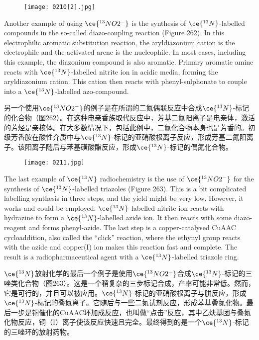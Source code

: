 \documentclass[dvipsnames, svgnames,a4paper,11pt]{article}
\begin{document}
\begin{figure}[h]
	\centering
    \texttt{[image: 0210[2].jpg]} 
     \label{fig261}
\end{figure}

Another example of using \(\ce{^{13}NO2^{-}}\) is the synthesis of \(\ce{^{13}N}\)-labelled compounds in the so-called diazo-coupling reaction (Figure 262). In this electrophilic aromatic substitution reaction, the aryldiazonium cation is the electrophile and the activated arene is the nucleophile. In most cases, including this example, the diazonium compound is also aromatic. Primary aromatic amine reacts with \(\ce{^{13}N}\)-labelled nitrite ion in acidic media, forming the aryldiazonium cation. This cation then reacts with phenyl-sulphonate to couple into a \(\ce{^{13}N}\)-labelled azo-compound.

另一个使用\(\ce{^{13}NO2^{-}}\)的例子是在所谓的二氮偶联反应中合成\(\ce{^{13}N}\)-标记的化合物（图262）。在这种电亲香族取代反应中，芳基二氮阳离子是电亲体，激活的芳烃是亲核体。在大多数情况下，包括此例中，二氮化合物本身也是芳香的。初级芳香胺在酸性介质中与\(\ce{^{13}N}\)-标记的亚硝酸根离子反应，形成芳基二氮阳离子。该阳离子随后与苯基磺酸酯反应，形成\(\ce{^{13}N}\)-标记的偶氮化合物。

\begin{figure}[h]
	\centering
    \texttt{[image: 0211.jpg]} 
 \label{fig262}
\end{figure}

The last example of \(\ce{^{13}N}\) radiochemistry is the use of \(\ce{^{13}NO2^{-}}\) for the synthesis of \(\ce{^{13}N}\)-labelled triazoles (Figure 263). This is a bit complicated labelling synthesis in three steps, and the yield might be very low. However, it works and could be employed. \(\ce{^{13}N}\)-labelled nitrite ion reacts with hydrazine to form a \(\ce{^{13}N}\)-labelled azide ion. It then reacts with some diazo-reagent and forms phenyl-azide. The last step is a copper-catalysed CuAAC cycloaddition, also called the “click” reaction, where the ethynyl group reacts with the azide and copper(I) ion makes this reaction fast and complete. The result is a radiopharmaceutical agent with a \(\ce{^{13}N}\)-labelled triazole ring.

\(\ce{^{13}N}\)放射化学的最后一个例子是使用\(\ce{^{13}NO2^{-}}\)合成\(\ce{^{13}N}\)-标记的三唑类化合物（图263）。这是一个稍复杂的三步标记合成，产率可能非常低。然而，它是可行的，并且可以被应用。\(\ce{^{13}N}\)-标记的亚硝酸根离子与肼反应，形成\(\ce{^{13}N}\)-标记的叠氮离子。它随后与一些二氮试剂反应，形成苯基叠氮化物。最后一步是铜催化的CuAAC环加成反应，也叫做“点击”反应，其中乙炔基团与叠氮化物反应，铜（I）离子使该反应快速且完全。最终得到的是一个\(\ce{^{13}N}\)-标记的三唑环的放射药物。
\end{document}
